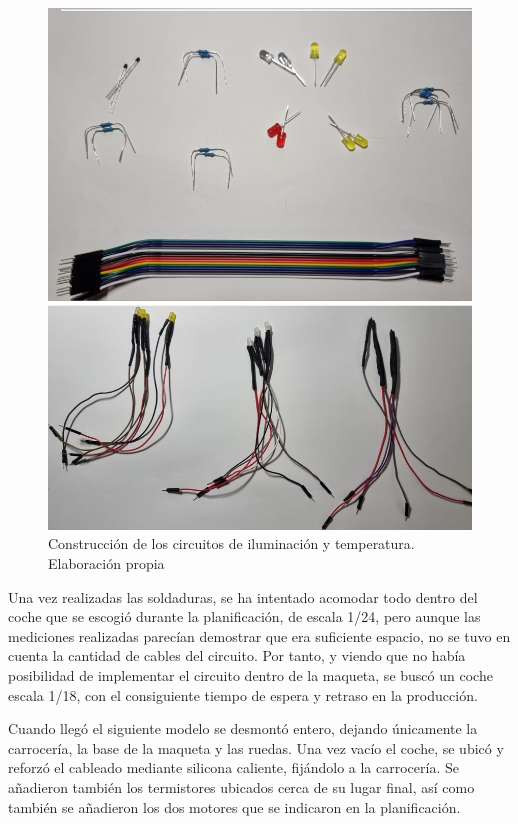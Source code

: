  \begin{figure}[H]
    \centering
    \includegraphics[width=1\textwidth]{imagenes/montaje/luces.jpg}
    \caption{Construcción de los circuitos de iluminación y temperatura. Elaboración propia}
\end{figure}



Una vez realizadas las soldaduras, se ha intentado acomodar todo dentro del coche que se escogió durante la planificación, de escala 1/24, pero aunque las mediciones realizadas parecían demostrar que era suficiente espacio, no se tuvo en cuenta la cantidad de cables del circuito. Por tanto, y viendo que no había posibilidad de implementar el circuito dentro de la maqueta, se buscó un coche escala 1/18, con el consiguiente tiempo de espera y retraso en la producción. 

Cuando llegó el siguiente modelo se desmontó entero, dejando únicamente la carrocería, la base de la maqueta y las ruedas. Una vez vacío el coche, se ubicó y reforzó el cableado mediante silicona caliente, fijándolo a la carrocería. Se añadieron también los termistores ubicados cerca de su lugar final, así como también se añadieron los dos motores que se indicaron en la planificación. 

